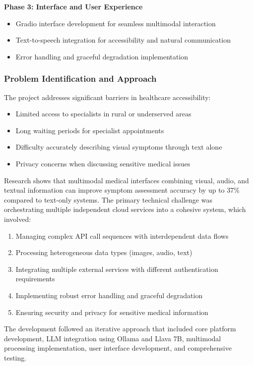 \documentclass[12pt,a4paper]{article}
\begin{document}
\textbf{Phase 3: Interface and User Experience}
\begin{itemize}
    \item Gradio interface development for seamless multimodal interaction
    \item Text-to-speech integration for accessibility and natural communication
    \item Error handling and graceful degradation implementation
\end{itemize}

\subsubsection{Problem Identification and Approach}
The project addresses significant barriers in healthcare accessibility:
\begin{itemize}
    \item Limited access to specialists in rural or underserved areas
    \item Long waiting periods for specialist appointments
    \item Difficulty accurately describing visual symptoms through text alone
    \item Privacy concerns when discussing sensitive medical issues
\end{itemize}

Research shows that multimodal medical interfaces combining visual, audio, and textual information can improve symptom assessment accuracy by up to 37\% compared to text-only systems. The primary technical challenge was orchestrating multiple independent cloud services into a cohesive system, which involved:

\begin{enumerate}
    \item Managing complex API call sequences with interdependent data flows
    \item Processing heterogeneous data types (images, audio, text)
    \item Integrating multiple external services with different authentication requirements
    \item Implementing robust error handling and graceful degradation
    \item Ensuring security and privacy for sensitive medical information
\end{enumerate}

The development followed an iterative approach that included core platform development, LLM integration using Ollama and Llava 7B, multimodal processing implementation, user interface development, and comprehensive testing.
\end{document}
